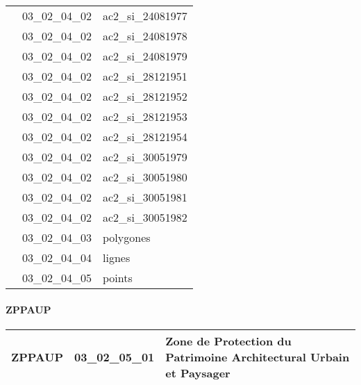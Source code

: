\documentclass[12pt,titlepage,oneside]{book}
\begin{document}
\begin{supertabular}{|p{10cm}|c|p{15cm}|}
                    & 03\_02\_04\_02 & ac2\_si\_24081977\\


                    & 03\_02\_04\_02 & ac2\_si\_24081978\\


                    & 03\_02\_04\_02 & ac2\_si\_24081979\\


                    & 03\_02\_04\_02 & ac2\_si\_28121951\\


                    & 03\_02\_04\_02 & ac2\_si\_28121952\\


                    & 03\_02\_04\_02 & ac2\_si\_28121953\\


                    & 03\_02\_04\_02 & ac2\_si\_28121954\\


                    & 03\_02\_04\_02 & ac2\_si\_30051979\\


                    & 03\_02\_04\_02 & ac2\_si\_30051980\\


                    & 03\_02\_04\_02 & ac2\_si\_30051981\\


                    & 03\_02\_04\_02 & ac2\_si\_30051982\\


                    & 03\_02\_04\_03 & polygones\\


                    & 03\_02\_04\_04 & lignes\\


                    & 03\_02\_04\_05 & points\\
\hline
\end{supertabular}


\paragraph{ZPPAUP}
\noindent
\vspace{\baselineskip}

\renewcommand{\arraystretch}{1.2}
\begin{supertabular}{|p{10cm}|c|p{15cm}|}
 ZPPAUP & 03\_02\_05\_01 & Zone de Protection du Patrimoine Architectural Urbain et Paysager\\
\hline
\end{supertabular}
\end{document}
